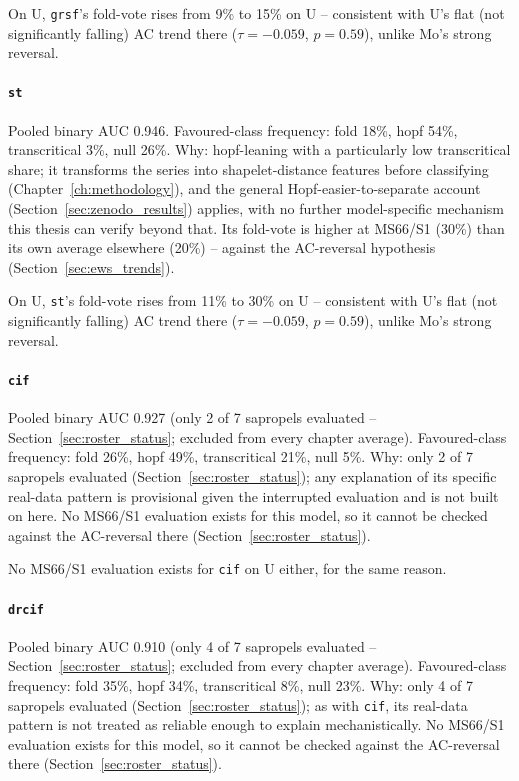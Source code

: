 On U, \texttt{grsf}'s fold-vote rises from 9\% to 15\% on U -- consistent with U's flat (not significantly falling) AC trend there ($\tau=-0.059$, $p=0.59$), unlike Mo's strong reversal.

\paragraph{\texttt{st}} Pooled binary AUC 0.946. Favoured-class frequency: fold 18\%, hopf 54\%, transcritical 3\%, null 26\%. Why: hopf-leaning with a particularly low transcritical share; it transforms the series into shapelet-distance features before classifying (Chapter~\ref{ch:methodology}), and the general Hopf-easier-to-separate account (Section~\ref{sec:zenodo_results}) applies, with no further model-specific mechanism this thesis can verify beyond that. Its fold-vote is higher at MS66/S1 (30\%) than its own average elsewhere (20\%) -- against the AC-reversal hypothesis (Section~\ref{sec:ews_trends}).

On U, \texttt{st}'s fold-vote rises from 11\% to 30\% on U -- consistent with U's flat (not significantly falling) AC trend there ($\tau=-0.059$, $p=0.59$), unlike Mo's strong reversal.

\paragraph{\texttt{cif}} Pooled binary AUC 0.927 (only 2 of 7 sapropels evaluated -- Section~\ref{sec:roster_status}; excluded from every chapter average). Favoured-class frequency: fold 26\%, hopf 49\%, transcritical 21\%, null 5\%. Why: only 2 of 7 sapropels evaluated (Section~\ref{sec:roster_status}); any explanation of its specific real-data pattern is provisional given the interrupted evaluation and is not built on here. No MS66/S1 evaluation exists for this model, so it cannot be checked against the AC-reversal there (Section~\ref{sec:roster_status}).

No MS66/S1 evaluation exists for \texttt{cif} on U either, for the same reason.

\paragraph{\texttt{drcif}} Pooled binary AUC 0.910 (only 4 of 7 sapropels evaluated -- Section~\ref{sec:roster_status}; excluded from every chapter average). Favoured-class frequency: fold 35\%, hopf 34\%, transcritical 8\%, null 23\%. Why: only 4 of 7 sapropels evaluated (Section~\ref{sec:roster_status}); as with \texttt{cif}, its real-data pattern is not treated as reliable enough to explain mechanistically. No MS66/S1 evaluation exists for this model, so it cannot be checked against the AC-reversal there (Section~\ref{sec:roster_status}).

